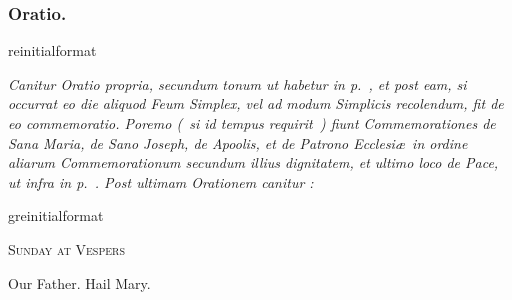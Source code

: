 \documentclass[12pt]{article} %
\newcommand{\myaboveinitial}[1]{%
    \expandafter\renewcommand\csname greinitialformat\endcsname[1]{%
        \fontsize{43}{43}\selectfont ##1
    }
    \gresetfirstlineaboveinitial{\textcolor{benred8}{\raisebox{6.0mm}{\small \textsc{\textbf{#1}}}}}{}
}
\newenvironment{rubric}{\vspace{2 mm}\color{benred8} \itshape \leftskip 0in \setlength{\parindent}{0.25in}}{\vspace{2 mm}}
\let\oldVbar\Vbar
\renewcommand{\Vbar}{\textcolor{benred8}{\oldVbar .}}
\begin{document}
\begin{pages}
\begin{Leftside}
\begin{rubric}
\end{rubric}

\pend\pstart

\subsubsection*{Oratio.}

\pend\pstart


\myaboveinitial{\Vbar}

\pend\pstart

\begin{rubric}
Canitur Oratio propria, secundum tonum ut habetur in p.~\pageref{sec:TonusOrationis}, et post eam, si occurrat eo die aliquod Feum Simplex, vel ad modum Simplicis recolendum, fit de eo commemoratio. Poremo (~si id tempus requirit~) fiunt Commemorationes de Sana Maria, de Sano Joseph, de Apoolis, et de Patrono Ecclesi\ae\ in ordine aliarum Commemorationum secundum illius dignitatem, et ultimo loco de Pace, ut infra in p.~\pageref{sec:Commem}. Post ultimam Orationem canitur :

\end{rubric}

\pend\pstart

\myaboveinitial{\Vbar}

\pend\endnumbering
\end{Leftside}
\begin{Rightside}

\beginnumbering\pstart




\begin{center}\begin{Huge}\textsc{\textcolor{benred8}{Sunday at Vespers}}\end{Huge}\end{center}

\pend\pstart

\begin{center}Our Father. Hail Mary.\end{center}


\end{Rightside}
\end{pages}
\end{document}
